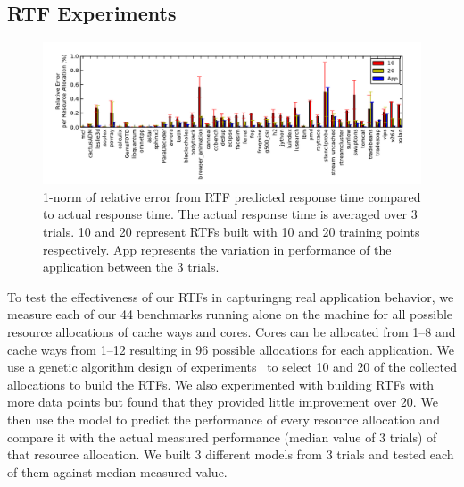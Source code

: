 

\subsection*{RTF Experiments}
\begin{figure}[!t]
	\begin{center}	
		\includegraphics[width=\textwidth]{model_accuracy.pdf}
		\caption{1-norm of relative error from RTF predicted response time compared to actual response time.  The actual response time is averaged over 3 trials. 10 and 20 represent RTFs built with 10 and 20 training points respectively.  App represents the variation in performance of the application between the 3 trials.}
		\label{model_accuracy}
	\end{center}
\end{figure}
To test the effectiveness of our RTFs in capturingng real application behavior, we measure each of our 44 benchmarks running alone on the machine for all possible resource allocations of cache ways and cores.  Cores can be allocated from 1--8 and cache ways from 1--12 resulting in 96 possible allocations for each application.   We use a genetic algorithm design of experiments~\cite{bates-aes03} to select 10 and 20 of the collected allocations to build the RTFs.  We also experimented with building RTFs with more data points but found that they provided little improvement over 20.  We then use the model to predict the performance of every resource allocation and compare it with the actual measured performance (median value of 3 trials) of that resource allocation.  We built 3 different models from 3 trials and tested each of them against median measured value. 

